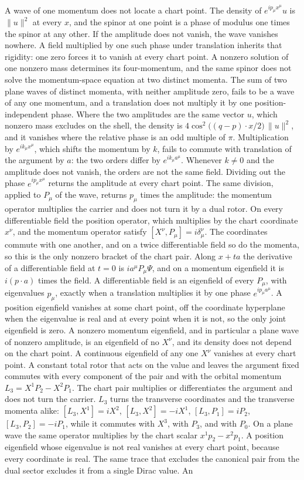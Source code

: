 \documentclass[a4paper]{article}
\begin{document}
A wave of one momentum does not locate a chart point. The density of $e^{ip_\mu x^\mu}u$ is $\lVert u\rVert^2$ at every $x$, and the spinor at one point is a phase of modulus one times the spinor at any other. If the amplitude does not vanish, the wave vanishes nowhere. A field multiplied by one such phase under translation inherits that rigidity: one zero forces it to vanish at every chart point. A nonzero solution of one nonzero mass determines its four-momentum, and the same spinor does not solve the momentum-space equation at two distinct momenta. The sum of two plane waves of distinct momenta, with neither amplitude zero, fails to be a wave of any one momentum, and a translation does not multiply it by one position-independent phase. Where the two amplitudes are the same vector $u$, which nonzero mass excludes on the shell, the density is $4\cos^2\bigl((q-p)\cdot x/2\bigr)\,\lVert u\rVert^2$, and it vanishes where the relative phase is an odd multiple of $\pi$. Multiplication by $e^{ik_\mu x^\mu}$, which shifts the momentum by $k$, fails to commute with translation of the argument by $a$: the two orders differ by $e^{ik_\mu a^\mu}$. Whenever $k\neq 0$ and the amplitude does not vanish, the orders are not the same field. Dividing out the phase $e^{ip_\mu x^\mu}$ returns the amplitude at every chart point. The same division, applied to $P_\mu$ of the wave, returns $p_\mu$ times the amplitude: the momentum operator multiplies the carrier and does not turn it by a dual rotor. On every differentiable field the position operator, which multiplies by the chart coordinate $x^\nu$, and the momentum operator satisfy $[X^\nu,P_\mu]=i\delta^\nu_\mu$. The coordinates commute with one another, and on a twice differentiable field so do the momenta, so this is the only nonzero bracket of the chart pair. Along $x+ta$ the derivative of a differentiable field at $t=0$ is $ia^\mu P_\mu\Psi$, and on a momentum eigenfield it is $i(p\cdot a)$ times the field. A differentiable field is an eigenfield of every $P_\mu$, with eigenvalues $p_\mu$, exactly when a translation multiplies it by one phase $e^{ip_\mu a^\mu}$. A position eigenfield vanishes at some chart point, off the coordinate hyperplane when the eigenvalue is real and at every point when it is not, so the only joint eigenfield is zero. A nonzero momentum eigenfield, and in particular a plane wave of nonzero amplitude, is an eigenfield of no $X^\nu$, and its density does not depend on the chart point. A continuous eigenfield of any one $X^\nu$ vanishes at every chart point. A constant total rotor that acts on the value and leaves the argument fixed commutes with every component of the pair and with the orbital momentum $L_3=X^1P_2-X^2P_1$. The chart pair multiplies or differentiates the argument and does not turn the carrier. $L_3$ turns the transverse coordinates and the transverse momenta alike: $[L_3,X^1]=iX^2$, $[L_3,X^2]=-iX^1$, $[L_3,P_1]=iP_2$, $[L_3,P_2]=-iP_1$, while it commutes with $X^3$, with $P_3$, and with $P_0$. On a plane wave the same operator multiplies by the chart scalar $x^1p_2-x^2p_1$. A position eigenfield whose eigenvalue is not real vanishes at every chart point, because every coordinate is real. The same trace that excludes the canonical pair from the dual sector excludes it from a single Dirac value. An 
\end{document}
